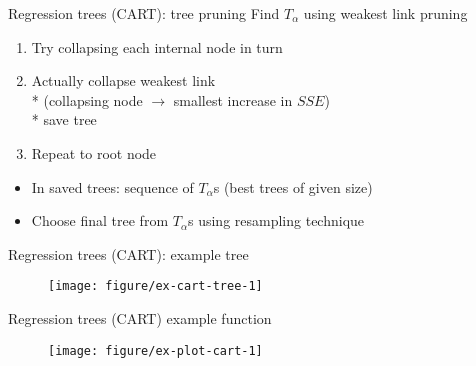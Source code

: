 \documentclass{beamer}
\begin{document}
\begin{frame}[c]{Regression trees (CART): tree pruning}
  Find $T_{\alpha}$ using weakest link pruning
      \begin{enumerate}[<+(1)->]
        \item Try collapsing each internal node in turn
        \item Actually collapse weakest link \\*
        (collapsing node $\rightarrow$ smallest increase in $SSE$) \\*
         save tree
        \item Repeat to root node 
      \end{enumerate}
      
      \begin{itemize}[<+(1)->]
        \item In saved trees: sequence of $T_{\alpha}$s (best trees of given size)
        \item Choose final tree from $T_{\alpha}$s using resampling technique
      \end{itemize}
      

\end{frame}

\begin{frame}[c]{Regression trees (CART): example tree}
  \begin{figure}[!htbp]
  \begin{center}
    \texttt{[image: figure/ex-cart-tree-1]}
  \end{center}
  \end{figure}
\end{frame}

\begin{frame}{Regression trees (CART) example function}
  \begin{figure}[!htbp]
  \begin{center}
    \texttt{[image: figure/ex-plot-cart-1]}
  \end{center}
  \end{figure}
\end{frame}

%
\end{document}
